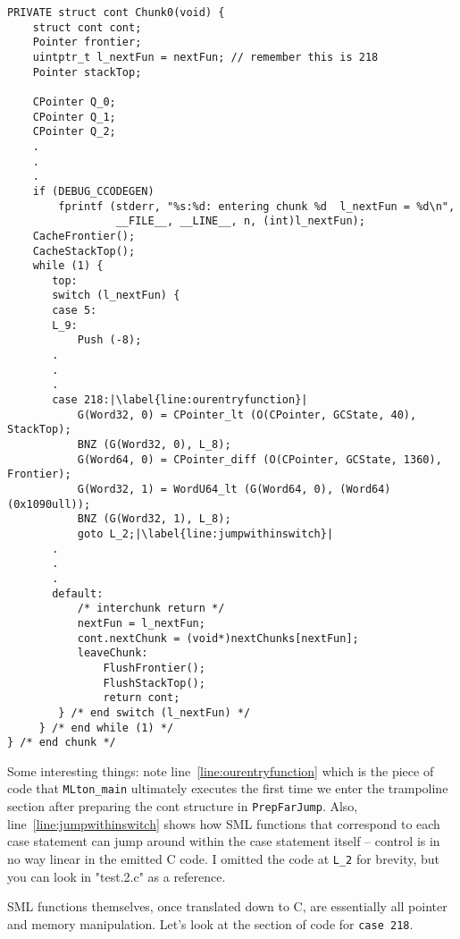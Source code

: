 \lstset{language=C,escapechar=|}\begin{lstlisting}
PRIVATE struct cont Chunk0(void) {
    struct cont cont;
    Pointer frontier;
    uintptr_t l_nextFun = nextFun; // remember this is 218
    Pointer stackTop;
 
    CPointer Q_0;
    CPointer Q_1;
    CPointer Q_2;
	.
	.
	.
    if (DEBUG_CCODEGEN)
        fprintf (stderr, "%s:%d: entering chunk %d  l_nextFun = %d\n",
                 __FILE__, __LINE__, n, (int)l_nextFun);
    CacheFrontier();
    CacheStackTop();
    while (1) {
       top:
       switch (l_nextFun) {
       case 5:
       L_9:
           Push (-8);
	   .
	   .
	   .
       case 218:|\label{line:ourentryfunction}|
           G(Word32, 0) = CPointer_lt (O(CPointer, GCState, 40), StackTop);
           BNZ (G(Word32, 0), L_8);
           G(Word64, 0) = CPointer_diff (O(CPointer, GCState, 1360), Frontier);
           G(Word32, 1) = WordU64_lt (G(Word64, 0), (Word64)(0x1090ull));
           BNZ (G(Word32, 1), L_8);
           goto L_2;|\label{line:jumpwithinswitch}|
	   .
	   .
	   .
       default:
           /* interchunk return */
           nextFun = l_nextFun;
           cont.nextChunk = (void*)nextChunks[nextFun];
           leaveChunk:
               FlushFrontier();
               FlushStackTop();
               return cont;
        } /* end switch (l_nextFun) */
     } /* end while (1) */
} /* end chunk */	
\end{lstlisting}

Some interesting things: note line~\ref{line:ourentryfunction} which is the piece of code that \texttt{MLton\_main} ultimately executes the first time we enter the trampoline section after preparing the cont structure in \texttt{PrepFarJump}. Also, line~\ref{line:jumpwithinswitch} shows how SML functions that correspond to each case statement can jump around within the case statement itself -- control is in no way linear in the emitted C code. I omitted the code at \texttt{L\_2} for brevity, but you can look in "test.2.c" as a reference.


SML functions themselves, once translated down to C, are essentially all pointer and memory manipulation. Let's look at the section of code for \texttt{case 218}.



